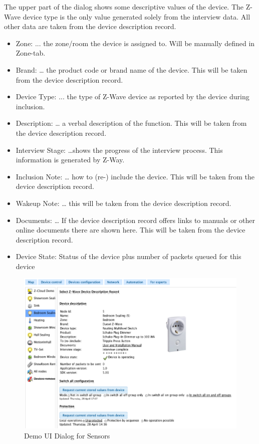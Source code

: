 The upper part of the dialog shows some descriptive values of the device.  The Z-Wave device type is the only value generated solely from the interview data. All other data are taken from the device description record.
\begin{itemize}
\item Zone: ... the zone/room the device is assigned to. Will be manually defined in Zone-tab.
\item Brand: … the product code or brand name of the device. This will be taken from the device description record.
\item Device Type: ... the type of Z-Wave device as reported by the device during inclusion.
\item Description: … a verbal description of the function. This will be taken from the device description record.
\item Interview Stage: …shows the progress of the interview process. This information is generated by Z-Way.
\item Inclusion Note: … how to (re-) include the device. This will be taken from the device description record.
\item Wakeup Note: … this will be taken from the device description record.
\item Documents: … If the device description record offers links to manuals or other online documents there are shown here. This will be taken from the device description record.
\item Device State:  Status of the device plus number of packets queued for this device
 \end{itemize}

\begin{figure} 
\begin{center}
\includegraphics[scale=0.7]{pics/dconfig.png}
\caption{Demo UI Dialog for Sensors}
\label{c1:demosensors} 
\end{center}
 \end{figure}


